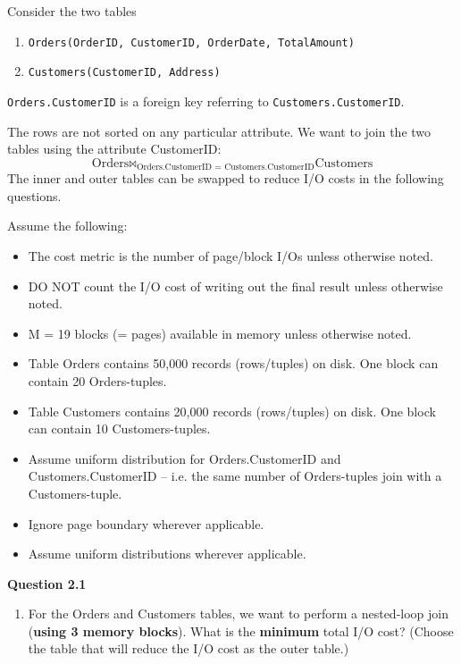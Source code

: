 \documentclass{article}
\begin{document}
    \begin{example}
      Consider the two tables
      \begin{enumerate}
        \item \texttt{Orders(OrderID, CustomerID, OrderDate, TotalAmount)} 
        \item \texttt{Customers(CustomerID, Address)}
      \end{enumerate}
      \texttt{Orders.CustomerID} is a foreign key referring to \texttt{Customers.CustomerID}.

      The rows are not sorted on any particular attribute. We want to join the two tables using the attribute CustomerID:
      \[
      \text{Orders} \bowtie_{\text{Orders.CustomerID = Customers.CustomerID}} \text{Customers}
      \]
      The inner and outer tables can be swapped to reduce I/O costs in the following questions.

      Assume the following:
      \begin{itemize}
        \item The cost metric is the number of page/block I/Os unless otherwise noted.
        \item DO NOT count the I/O cost of writing out the final result unless otherwise noted.
        \item M = 19 blocks (= pages) available in memory unless otherwise noted.
        \item Table Orders contains 50,000 records (rows/tuples) on disk. One block can contain 20 Orders-tuples.
        \item Table Customers contains 20,000 records (rows/tuples) on disk. One block can contain 10 Customers-tuples.
        \item Assume uniform distribution for Orders.CustomerID and Customers.CustomerID -- i.e. the same number of Orders-tuples join with a Customers-tuple.
        \item Ignore page boundary wherever applicable.
        \item Assume uniform distributions wherever applicable.
      \end{itemize}

      \vspace{1em}
      \noindent\textbf{Question 2.1}
      \begin{enumerate}[label=(\alph*)]
        \item For the Orders and Customers tables, we want to perform a nested-loop join (\textbf{using 3 memory blocks}). What is the \textbf{minimum} total I/O cost? (Choose the table that will reduce the I/O cost as the outer table.)
        

\end{enumerate}
\end{example}
\end{document}
